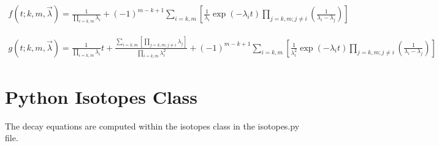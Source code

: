 \documentclass[12pt,twoside]{manual}
\begin{document}
\begin{equation}
\begin{split}
f(t;k,m,\vec{\lambda})
= \frac{1}{\prod_{i=k,m} \lambda_i }
+ \left( -1 \right)^{m-k+1}
\sum_{i=k,m}
\left[
\frac{1}{\lambda_i }
\exp(-\lambda_i t)
\prod_{j=k,m;j\neq i}
\left(
\frac{1}{\lambda_i - \lambda_j}
\right )
\right]
\end{split}
\end{equation}

\begin{equation}
\begin{split}
g(t;k,m,\vec{\lambda})
= \frac{1}{\prod_{i=k,m} \lambda_i } t
+ \frac{\sum_{i=k,m} \left[ \prod_{j=k,m; j \neq i} \lambda_{j} \right]}
{\prod_{i=k,m} \lambda_{i}^2}
+ \left( -1 \right)^{m-k+1}
\sum_{i=k,m}
\left[
\frac{1}{\lambda_i^2}
\exp(-\lambda_i t)
\prod_{j=k,m;j\neq i}
\left(
\frac{1}{\lambda_i - \lambda_j}
\right)
\right]
\end{split}
\end{equation}




\section{Python Isotopes Class}

The decay equations are computed within the isotopes class in the isotopes.py file.
\end{document}
